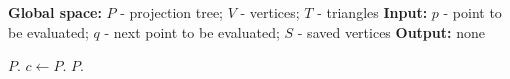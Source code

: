 \begin{algorithm}[h]
	\begin{algorithmic}[0]
		\Statex
		\State\textbf{\hspace{-7pt}Global space:} $P$ - projection tree; $V$ - vertices; $T$ - triangles
		\State\textbf{\hspace{-7pt}Input:} $p$ - point to be evaluated; $q$ - next point to be evaluated; $S$ - saved vertices
		\State\textbf{\hspace{-7pt}Output:} none
	\end{algorithmic}
	\begin{algorithmic}[1]
		\vspace{3pt}
		\State $P.$ \raisedrule{}
		\State $c \leftarrow P.$ \raisedrule{}
		 \raisedrule{}
		\State $P.$ \raisedrule{}
		\State \Return \raisedrule{}
		\EndIf
		

\end{algorithmic}
\end{algorithm}
